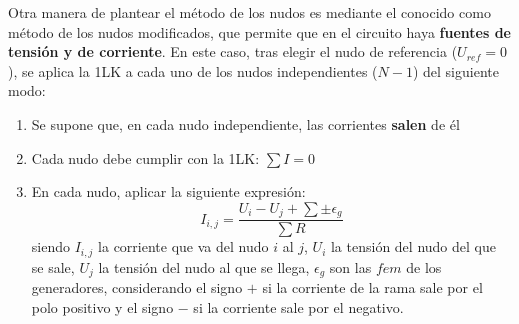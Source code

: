 	Otra manera de plantear el método de los nudos es mediante el
        conocido como método de los nudos modificados, que permite que
        en el circuito haya \textbf{fuentes de tensión y de
          corriente}. En este caso, tras elegir el nudo de referencia
        ($U_{ref}=0$), se aplica la 1LK a cada uno de los nudos
        independientes ($N-1$) del siguiente modo:
	\begin{enumerate}
        \item Se supone que, en cada nudo independiente, las
          corrientes \textbf{salen} de él
        \item Cada nudo debe cumplir con la 1LK: $\sum I=0$
        \item En cada nudo, aplicar la siguiente expresión:
          \begin{equation*}
            I_{i,j}=\dfrac{U_i-U_j+\sum\pm \epsilon_g}{\sum R}
          \end{equation*}
          siendo $I_{i,j}$ la corriente que va del nudo $i$ al $j$,
          $U_i$ la tensión del nudo del que se sale, $U_j$ la tensión
          del nudo al que se llega, $\epsilon_g$ son las $fem$ de los
          generadores, considerando el signo $+$ si la corriente de la
          rama sale por el polo positivo y el signo $-$ si la
          corriente sale por el negativo.
	\end{enumerate}
	
